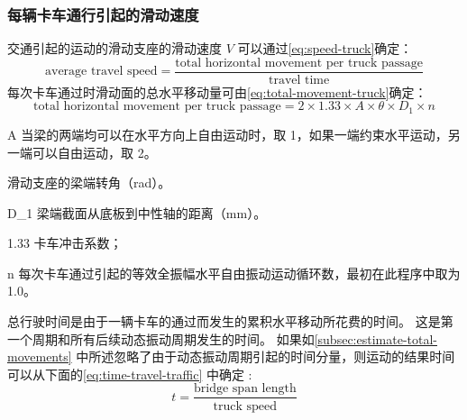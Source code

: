 \subsubsection{每辆卡车通行引起的滑动速度}
交通引起的运动的滑动支座的滑动速度 $V$ 可以通过\cref{eq:speed-truck}确定：
\begin{equation}
  \label{eq:speed-truck}
  \text{average travel speed} = \frac{\text{total horizontal movement per truck passage}}{\text{travel time}}
\end{equation}
每次卡车通过时滑动面的总水平移动量可由\cref{eq:total-movement-truck}确定：
\begin{equation}
  \label{eq:total-movement-truck}
  \text{total horizontal movement per truck passage} = 2 \times 1.33 \times A \times \theta \times  D_1 \times n
\end{equation}
\begin{EqDesc}{1.33}
  \item [A] 当梁的两端均可以在水平方向上自由运动时，取 1，如果一端约束水平运动，另一端可以自由运动，取 2。
  \item [\theta] 滑动支座的梁端转角（\unit{rad}）。
  \item [D_1] 梁端截面从底板到中性轴的距离（\unit{mm}）。
  \item [1.33] 卡车冲击系数；
  \item [n] 每次卡车通过引起的等效全振幅水平自由振动运动循环数，最初在此程序中取为 1.0。
\end{EqDesc}

总行驶时间是由于一辆卡车的通过而发生的累积水平移动所花费的时间。 这是第一个周期和所有后续动态振动周期发生的时间。 如果如\cref{subsec:estimate-total-movements} 中所述忽略了由于动态振动周期引起的时间分量，则运动的结果时间可以从下面的\cref{eq:time-travel-traffic} 中确定 :
\begin{equation}
  \label{eq:time-travel-traffic}
  t = \frac{\text{bridge span length}}{\text{truck speed}}
\end{equation}

